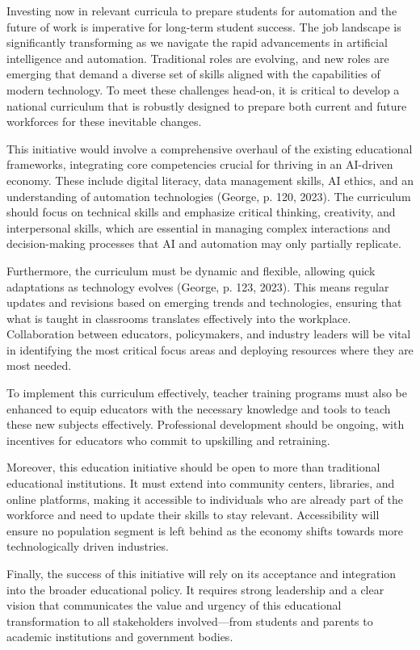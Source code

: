 \documentclass[11pt]{article}
\begin{document}
Investing now in relevant curricula to prepare students for automation and the future of work is imperative for long-term student success. The job landscape is significantly transforming as we navigate the rapid advancements in artificial intelligence and automation. Traditional roles are evolving, and new roles are emerging that demand a diverse set of skills aligned with the capabilities of modern technology. To meet these challenges head-on, it is critical to develop a national curriculum that is robustly designed to prepare both current and future workforces for these inevitable changes.

This initiative would involve a comprehensive overhaul of the existing educational frameworks, integrating core competencies crucial for thriving in an AI-driven economy. These include digital literacy, data management skills, AI ethics, and an understanding of automation technologies (George, p. 120, 2023). The curriculum should focus on technical skills and emphasize critical thinking, creativity, and interpersonal skills, which are essential in managing complex interactions and decision-making processes that AI and automation may only partially replicate.

Furthermore, the curriculum must be dynamic and flexible, allowing quick adaptations as technology evolves (George, p. 123, 2023). This means regular updates and revisions based on emerging trends and technologies, ensuring that what is taught in classrooms translates effectively into the workplace. Collaboration between educators, policymakers, and industry leaders will be vital in identifying the most critical focus areas and deploying resources where they are most needed.

To implement this curriculum effectively, teacher training programs must also be enhanced to equip educators with the necessary knowledge and tools to teach these new subjects effectively. Professional development should be ongoing, with incentives for educators who commit to upskilling and retraining.

Moreover, this education initiative should be open to more than traditional educational institutions. It must extend into community centers, libraries, and online platforms, making it accessible to individuals who are already part of the workforce and need to update their skills to stay relevant. Accessibility will ensure no population segment is left behind as the economy shifts towards more technologically driven industries.

Finally, the success of this initiative will rely on its acceptance and integration into the broader educational policy. It requires strong leadership and a clear vision that communicates the value and urgency of this educational transformation to all stakeholders involved—from students and parents to academic institutions and government bodies.
\end{document}
